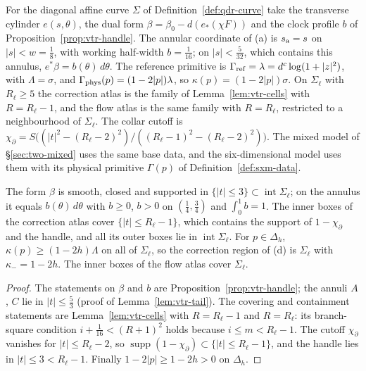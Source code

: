 \begin{construction}\label{cons:shd-handle-data}
For the diagonal affine curve $\Sigma$ of Definition~\ref{def:qdr-curve} take the transverse cylinder
$e(s,\theta)$, the dual form $\beta=\beta_0-d(e_*(\chi F))$ and the clock profile $b$ of Proposition~\ref{prop:vtr-handle}.
The annular coordinate of (a) is $s_{\rm a}=s$ on $|s|<w=\frac18$, with working
half-width $b=\frac1{16}$; on $|s|<\frac5{32}$, which contains this annulus, $e^*\beta=b(\theta)\,d\theta$. The reference
primitive is $\Gamma_{\rm ref}=\lambda=d^c\log(1+|z|^2)$, with $\Lambda=\sigma$, and $\Gamma_{\rm phys}(p)=(1-2|p|)\lambda$,
so $\kappa(p)=(1-2|p|)\sigma$. On $\Sigma_\ell$ with $R_\ell\ge5$ the correction atlas is the family of
Lemma~\ref{lem:vtr-cells} with $R=R_\ell-1$, and the flow atlas is the same family with $R=R_\ell$, restricted to a
neighbourhood of $\Sigma_\ell$. The collar cutoff is
$\chi_\partial=S\bigl((|t|^2-(R_\ell-2)^2)/((R_\ell-1)^2-(R_\ell-2)^2)\bigr)$. The mixed model of \S\ref{sec:two-mixed} uses
the same base data, and the six-dimensional model uses them with its physical primitive $\Gamma(p)$ of
Definition~\ref{def:sxm-data}.
\end{construction}

\begin{lemma}\label{lem:shd-handle-data}
The form $\beta$ is smooth, closed and supported in $\{|t|\le3\}\subset\operatorname{int}\Sigma_\ell$; on the annulus it equals
$b(\theta)\,d\theta$ with $b\ge0$, $b>0$ on $(\frac14,\frac34)$ and $\int_0^1b=1$. The inner boxes of the correction atlas
cover $\{|t|\le R_\ell-1\}$, which contains the support of $1-\chi_\partial$ and the handle, and all its outer boxes lie in
$\operatorname{int}\Sigma_\ell$. For $p\in\Delta_h$, $\kappa(p)\ge(1-2h)\Lambda$ on all of $\Sigma_\ell$, so the correction region
of (d) is $\Sigma_\ell$ with $\kappa_-=1-2h$. The inner boxes of the flow atlas cover
$\Sigma_\ell$.
\end{lemma}
\begin{proof}
The statements on $\beta$ and $b$ are Proposition~\ref{prop:vtr-handle}; the annuli $A$, $C$ lie in $|t|\le\frac53$
(proof of Lemma~\ref{lem:vtr-tail}). The covering and containment statements are Lemma~\ref{lem:vtr-cells} with
$R=R_\ell-1$ and $R=R_\ell$: its branch-square condition $i+\frac1{16}<(R+1)^2$ holds because $i\le m<R_\ell-1$. The
cutoff $\chi_\partial$ vanishes for $|t|\le R_\ell-2$, so $\operatorname{supp}(1-\chi_\partial)\subset\{|t|\le R_\ell-1\}$, and the
handle lies in $|t|\le3<R_\ell-1$. Finally $1-2|p|\ge1-2h>0$ on $\Delta_h$.
\end{proof}

